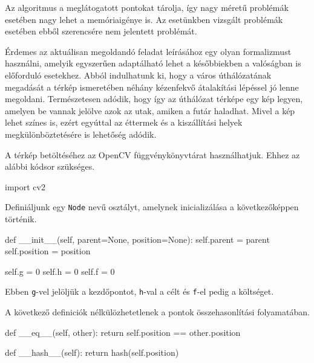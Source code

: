 Az algoritmus a meglátogatott pontokat tárolja, így nagy méretű problémák esetében nagy lehet a memóriaigénye is.
Az esetünkben vizsgált problémák esetében ebből szerencsére nem jelentett problémát. 


Érdemes az aktuálisan megoldandó feladat leírásához egy olyan formalizmust használni, amelyik egyszerűen adaptálható lehet a későbbiekben a valóságban is előforduló esetekhez.
Abból indulhatunk ki, hogy a város úthálózatának megadását a térkép ismeretében néhány kézenfekvő átalakítási lépéssel jó lenne megoldani.
Természetesen adódik, hogy így az úthálózat térképe egy kép legyen, amelyen be vannak jelölve azok az utak, amiken a futár haladhat.
Mivel a kép lehet színes is, ezért egyúttal az éttermek és a kiszállítási helyek megkülönböztetésére is lehetőség adódik.

A térkép betöltéséhez az OpenCV függvénykönyvtárat használhatjuk.
Ehhez az alábbi kódsor szükséges.
\begin{python}
import cv2
\end{python}

Definiáljunk egy \texttt{Node} nevű osztályt, amelynek inicializálása a következőképpen történik.
\begin{python}
def __init__(self, parent=None, position=None):
    self.parent = parent
    self.position = position

    self.g = 0
    self.h = 0
    self.f = 0
\end{python}
Ebben \texttt{g}-vel jelöljük a kezdőpontot, \texttt{h}-val a célt és \texttt{f}-el pedig a költséget.

A következő definiciók nélkülözhetetlenek a pontok összehasonlítási folyamatában.

\begin{python}
def __eq__(self, other):
    return self.position == other.position

def __hash__(self):
    return hash(self.position)
\end{python}

